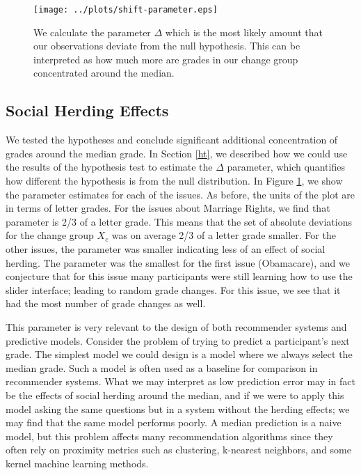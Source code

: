 \begin{figure}[ht!]
  \centering
    \texttt{[image: ../plots/shift-parameter.eps]}
      \caption{We calculate the parameter $\Delta$ which is the most likely amount that our observations deviate from the null hypothesis. This can be interpreted as how much more are grades in our change group concentrated around the median.}
      \label{shift-1}
\end{figure}

\subsection{Social Herding Effects}
We tested the hypotheses and conclude significant additional concentration of grades around the median grade.
In Section \ref{ht}, we described how we could use the results of the hypothesis test to estimate the $\Delta$ parameter, which quantifies how different the hypothesis is from the null distribution.
In Figure \ref{shift-1}, we show the parameter estimates for each of the issues.
As before, the units of the plot are in terms of letter grades.
For the issues about Marriage Rights, we find that parameter is 2/3 of a letter grade.
This means that the set of absolute deviations for the change group $X_c$ was on average 2/3 of a letter grade smaller.
For the other issues, the parameter was smaller indicating less of an effect of social herding.
The parameter was the smallest for the first issue (Obamacare), and we conjecture that for this issue many participants were still learning how to use the slider interface; leading to random grade changes.
For this issue, we see that it had the most number of grade changes as well.

This parameter is very relevant to the design of both recommender systems and predictive models.
Consider the problem of trying to predict a participant's next grade.
The simplest model we could design is a model where we always select the median grade.
Such a model is often used as a baseline for comparison in recommender systems.
What we may interpret as low prediction error may in fact be the effects of social herding around the median, and if we were to apply this model asking the same questions but in a system without the herding effects; we may find that the same model performs poorly.
A median prediction is a naive model, but this problem affects many recommendation algorithms since they often rely on proximity metrics such as clustering, k-nearest neighbors, and some kernel machine learning methods.

